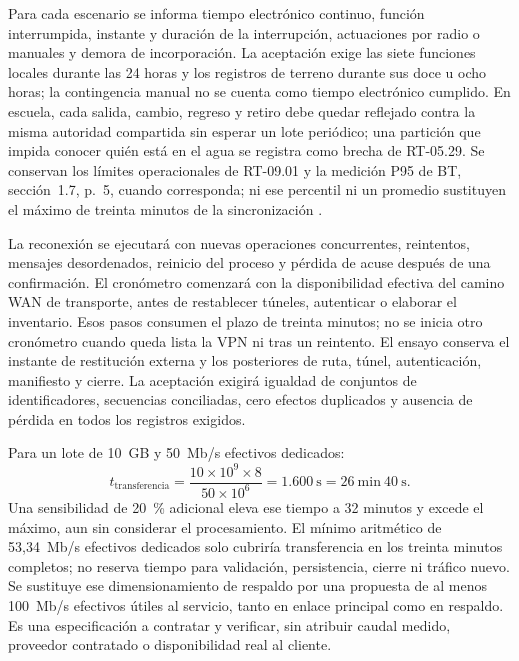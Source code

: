 Para cada escenario se informa tiempo electrónico continuo, función interrumpida, instante y duración de la interrupción, actuaciones por radio o manuales y demora de incorporación. La aceptación exige las siete funciones locales durante las 24 horas y los registros de terreno durante sus doce u ocho horas; la contingencia manual no se cuenta como tiempo electrónico cumplido. En escuela, cada salida, cambio, regreso y retiro debe quedar reflejado contra la misma autoridad compartida sin esperar un lote periódico; una partición que impida conocer quién está en el agua se registra como brecha de RT-05.29. Se conservan los límites operacionales de RT-09.01 y la medición P95 de BT, sección~1.7, p.~5, cuando corresponda; ni ese percentil ni un promedio sustituyen el máximo de treinta minutos de la sincronización \parencites[cap.~12, RT-12.10, p.~26]{bases-transversales}[cap.~15, RT-03.10/13 y RT-05.29]{caso07}.

La reconexión se ejecutará con nuevas operaciones concurrentes, reintentos, mensajes desordenados, reinicio del proceso y pérdida de acuse después de una confirmación. El cronómetro comenzará con la disponibilidad efectiva del camino WAN de transporte, antes de restablecer túneles, autenticar o elaborar el inventario. Esos pasos consumen el plazo de treinta minutos; no se inicia otro cronómetro cuando queda lista la VPN ni tras un reintento. El ensayo conserva el instante de restitución externa y los posteriores de ruta, túnel, autenticación, manifiesto y cierre. La aceptación exigirá igualdad de conjuntos de identificadores, secuencias conciliadas, cero efectos duplicados y ausencia de pérdida en todos los registros exigidos.

Para un lote de 10~GB y 50~Mb/s efectivos dedicados:
\[
t_{\mathrm{transferencia}}=
\frac{10\times10^9\times8}{50\times10^6}
=1.600\ \mbox{s}=26\ \mbox{min}\ 40\ \mbox{s}.
\]
Una sensibilidad de 20~\% adicional eleva ese tiempo a 32 minutos y excede el máximo, aun sin considerar el procesamiento. El mínimo aritmético de 53,34~Mb/s efectivos dedicados solo cubriría transferencia en los treinta minutos completos; no reserva tiempo para validación, persistencia, cierre ni tráfico nuevo. Se sustituye ese dimensionamiento de respaldo por una propuesta de al menos 100~Mb/s efectivos útiles al servicio, tanto en enlace principal como en respaldo. Es una especificación a contratar y verificar, sin atribuir caudal medido, proveedor contratado o disponibilidad real al cliente.

